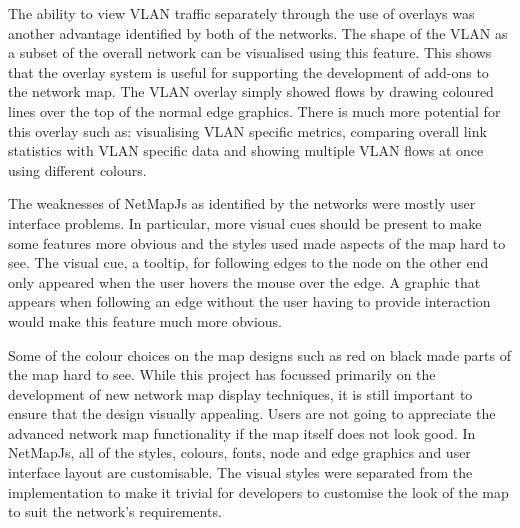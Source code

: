 \documentclass[11pt, a4paper]{report}
\begin{document}
The ability to view VLAN traffic separately through the use of overlays was
another advantage identified by both of the networks. The shape of the VLAN as a
subset of the overall network can be visualised using this feature. This shows
that the overlay system is useful for supporting the development of add-ons to
the network map. The VLAN overlay simply showed flows by drawing coloured lines
over the top of the normal edge graphics. There is much more potential for this
overlay such as: visualising VLAN specific metrics, comparing overall link
statistics with VLAN specific data and showing multiple VLAN flows at once using
different colours.

%
%
%
%
%
%

The weaknesses of NetMapJs as identified by the networks were mostly user
interface problems. In particular, more visual cues should be present to make
some features more obvious and the styles used made aspects of the map hard to
see. The visual cue, a tooltip, for following edges to the node on the other end
only appeared when the user hovers the mouse over the edge. A graphic that
appears when following an edge without the user having to provide interaction
would make this feature much more obvious. 

Some of the colour choices on the map designs such as red on black made parts of
the map hard to see. While this project has focussed primarily on the
development of new network map display techniques, it is still important to
ensure that the design visually appealing. Users are not going to appreciate the
advanced network map functionality if the map itself does not look good. In
NetMapJs, all of the styles, colours, fonts, node and edge graphics and user
interface layout are customisable. The visual styles were separated from the
implementation to make it trivial for developers to customise the look of the
map to suit the network's requirements.
\end{document}
